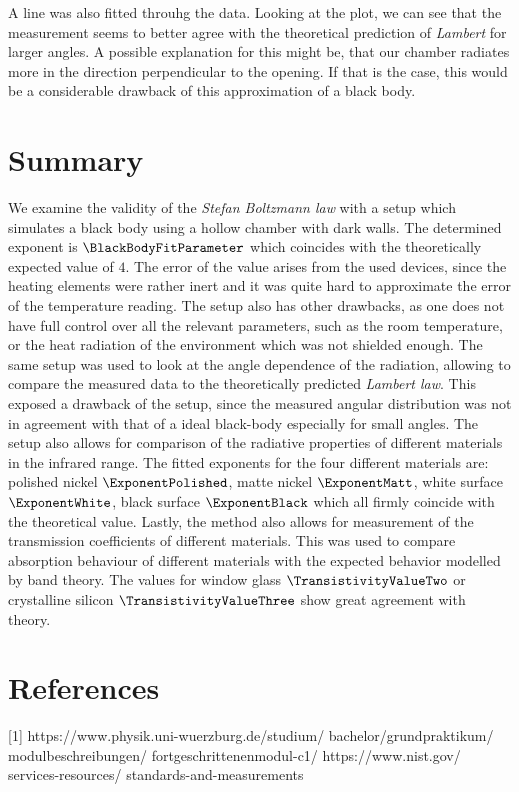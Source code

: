 \documentclass[a4paper,10pt,twocolumn]{article}
\begin{document}
    A line was also fitted throuhg the data.
    Looking at the plot, we can see that the measurement seems to better agree with the theoretical prediction of \textit{Lambert} for larger angles.
    A possible explanation for this might be, that our chamber radiates more in the direction perpendicular to the opening.
    If that is the case, this would be a considerable drawback of this approximation of a black body.
    
    
    
    
    \section{Summary}
    We examine the validity of the \textit{Stefan Boltzmann law} with a setup which simulates a black body using a hollow chamber with dark walls.
    The determined exponent is $\BlackBodyFitParameter$ which coincides with the theoretically expected value of $4$.
    The error of the value arises from the used devices, since the heating elements were rather inert and it was quite hard to approximate the error of the temperature reading.
    The setup also has other drawbacks, as one does not have full control over all the relevant parameters, such as the room temperature, or the heat radiation of the environment
    which was not shielded enough.
    The same setup was used to look at the angle dependence of the radiation, allowing to compare the measured data to the theoretically predicted \textit{Lambert law}.
    This exposed a drawback of the setup, since the measured angular distribution was not in agreement with that of a ideal black-body
    especially for small angles.
    The setup also allows for comparison of the radiative properties of different materials in the infrared range.
    The fitted exponents for the four different materials are: polished nickel $\ExponentPolished$, matte nickel $\ExponentMatt$,
    white surface $\ExponentWhite$, black surface $\ExponentBlack$ which all firmly coincide with the theoretical value.
    Lastly, the method also allows for measurement of the transmission coefficients of different materials.
    This was used to compare absorption behaviour of different materials with the expected behavior modelled by band theory.
    The values for window glass $\TransistivityValueTwo$ or crystalline silicon $\TransistivityValueThree$ show great agreement with theory.
    
    
    
    \section{References}
    [1] https://www.physik.uni-wuerzburg.de/studium/ bachelor/grundpraktikum/ modulbeschreibungen/ fortgeschrittenenmodul-c1/
    \newline
    [2] https://www.nist.gov/ services-resources/ standards-and-measurements
\end{document}
